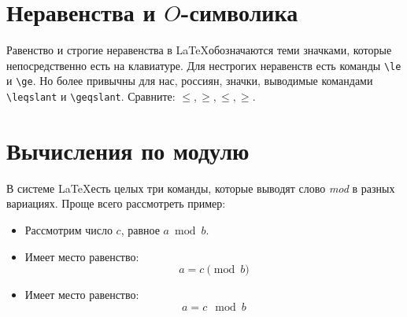 \section{Неравенства и \(O\)-символика}
\par Равенство и строгие неравенства в \LaTeX обозначаются теми значками, которые непосредственно есть на клавиатуре. Для нестрогих неравенств есть команды \verb"\le" и \verb"\ge". Но более привычны для нас, россиян, значки, выводимые командами \verb"\leqslant" и \verb"\geqslant". Сравните: \(\le,\ge,\leqslant,\geqslant\).

\section{Вычисления по модулю}
\par В системе \LaTeX есть целых три команды, которые выводят слово \emph{mod} в разных вариациях. Проще всего рассмотреть пример:
\begin{itemize}
\item Рассмотрим число \(c\), равное \(a\bmod b\).
\item Имеет место равенство: \[a=c\pmod{b}\]
\item Имеет место равенство: \[a=c\mod b\]
\end{itemize}